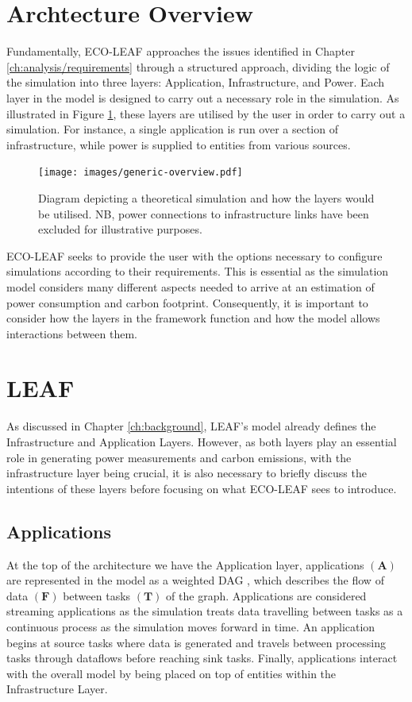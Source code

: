\documentclass{l4proj}
\begin{document}
\section{Archtecture Overview}\label{sec:architecture-overview}
Fundamentally, ECO-LEAF approaches the issues identified in Chapter \ref{ch:analysis/requirements} through a structured approach, dividing the logic of the simulation into three layers: Application, Infrastructure, and Power.
Each layer in the model is designed to carry out a necessary role in the simulation.
As illustrated in Figure \ref{fig:generic-overview}, these layers are utilised by the user in order to carry out a simulation.
For instance, a single application is run over a section of infrastructure, while power is supplied to entities from various sources.

\begin{figure}[htbp]
    \centering
    \texttt{[image: images/generic-overview.pdf]}
    ~
    \caption{Diagram depicting a theoretical simulation and how the layers would be utilised. NB, power connections to infrastructure links have been excluded for illustrative purposes.}
    \label{fig:generic-overview}
\end{figure}

ECO-LEAF seeks to provide the user with the options necessary to configure simulations according to their requirements.
This is essential as the simulation model considers many different aspects needed to arrive at an estimation of power consumption and carbon footprint.
Consequently, it is important to consider how the layers in the framework function and how the model allows interactions between them.

\section{LEAF}\label{sec:LEAF}
As discussed in Chapter \ref{ch:background}, LEAF's model already defines the Infrastructure and Application Layers.
However, as both layers play an essential role in generating power measurements and carbon emissions, with the infrastructure layer being crucial, it is also necessary to briefly discuss the intentions of these layers before focusing on what ECO-LEAF sees to introduce.

\subsection{Applications}\label{subsec:applications}
At the top of the architecture we have the Application layer, applications $\mathbf{(A)}$ are represented in the model as a weighted DAG \citep{leaf2021}, which describes the flow of data $\mathbf{(F)}$ between tasks $\mathbf{(T)}$ of the graph.
Applications are considered streaming applications as the simulation treats data travelling between tasks as a continuous process as the simulation moves forward in time.
An application begins at source tasks where data is generated and travels between processing tasks through dataflows before reaching sink tasks.
Finally, applications interact with the overall model by being placed on top of entities within the Infrastructure Layer.
\end{document}
